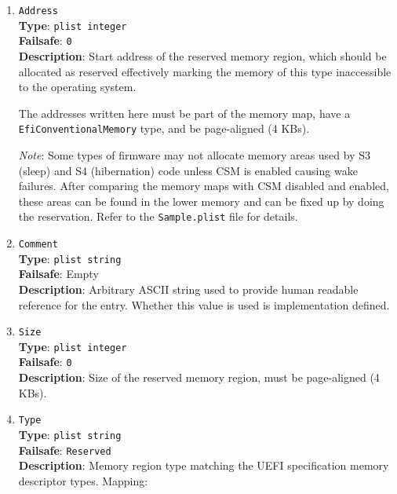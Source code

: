 \documentclass[]{article}
\begin{document}
\begin{enumerate}

\item
  \texttt{Address}\\
  \textbf{Type}: \texttt{plist\ integer}\\
  \textbf{Failsafe}: \texttt{0}\\
  \textbf{Description}: Start address of the reserved memory region, which should be allocated
  as reserved effectively marking the memory of this type inaccessible to the operating system.

  The addresses written here must be part of the memory map, have a \texttt{EfiConventionalMemory}
  type, and be page-aligned (4 KBs).

  \emph{Note}: Some types of firmware may not allocate memory areas used by S3 (sleep) and S4 (hibernation)
  code unless CSM is enabled causing wake failures. After comparing the memory maps with CSM disabled
  and enabled, these areas can be found in the lower memory and can be fixed up by doing the reservation.
  Refer to the \texttt{Sample.plist} file for details.

\item
  \texttt{Comment}\\
  \textbf{Type}: \texttt{plist\ string}\\
  \textbf{Failsafe}: Empty\\
  \textbf{Description}: Arbitrary ASCII string used to provide human readable
  reference for the entry. Whether this value is used is implementation defined.

\item
  \texttt{Size}\\
  \textbf{Type}: \texttt{plist\ integer}\\
  \textbf{Failsafe}: \texttt{0}\\
  \textbf{Description}: Size of the reserved memory region, must be page-aligned (4 KBs).

\item
  \texttt{Type}\\
  \textbf{Type}: \texttt{plist\ string}\\
  \textbf{Failsafe}: \texttt{Reserved}\\
  \textbf{Description}: Memory region type matching the UEFI specification memory descriptor
  types. Mapping:


\end{enumerate}
\end{document}
